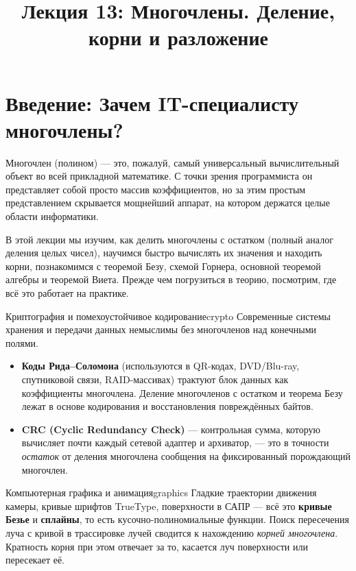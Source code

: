 \documentclass[12pt,a4paper]{article}
\title{Лекция 13: Многочлены. Деление, корни и разложение}
\author{}
\date{}
\begin{document}
\maketitle
\setcounter{section}{13}

\section*{Введение: Зачем IT-специалисту многочлены?}

Многочлен (полином) — это, пожалуй, самый универсальный
вычислительный объект во всей прикладной математике. С точки зрения
программиста он представляет собой просто массив коэффициентов, но за
этим простым представлением скрывается мощнейший аппарат, на котором
держатся целые области информатики.

В этой лекции мы изучим, как делить многочлены с остатком (полный
аналог деления целых чисел), научимся быстро вычислять их значения и
находить корни, познакомимся с теоремой Безу, схемой Горнера, основной
теоремой алгебры и теоремой Виета. Прежде чем погрузиться в теорию,
посмотрим, где всё это работает на практике.

\begin{remarkIT}{Криптография и помехоустойчивое кодирование}{crypto}
  Современные системы хранения и передачи данных немыслимы без
  многочленов над конечными полями.
  \begin{itemize}
    \item \textbf{Коды Рида--Соломона} (используются в QR-кодах,
      DVD/Blu-ray, спутниковой связи, RAID-массивах) трактуют блок
      данных как коэффициенты многочлена. Деление многочленов с
      остатком и теорема Безу лежат в основе кодирования и
      восстановления повреждённых байтов.
    \item \textbf{CRC (Cyclic Redundancy Check)} — контрольная сумма,
      которую вычисляет почти каждый сетевой адаптер и архиватор, —
      это в точности \emph{остаток} от деления многочлена сообщения на
      фиксированный порождающий многочлен.
  \end{itemize}
\end{remarkIT}

\begin{remarkIT}{Компьютерная графика и анимация}{graphics}
  Гладкие траектории движения камеры, кривые шрифтов TrueType,
  поверхности в САПР — всё это \textbf{кривые Безье} и
  \textbf{сплайны}, то есть кусочно-полиномиальные функции. Поиск
  пересечения луча с кривой в трассировке лучей сводится к нахождению
  \emph{корней многочлена}. Кратность корня при этом отвечает за то,
  касается луч поверхности или пересекает её.
\end{remarkIT}
\end{document}
